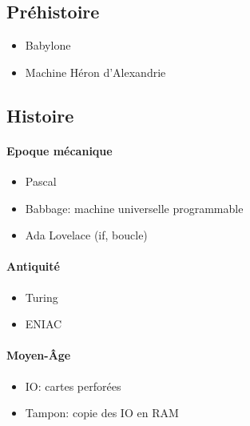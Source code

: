 \documentclass[11pt]{article}
\begin{document}
\subsection{Préhistoire}
\begin{itemize}
	\item Babylone
	\item Machine Héron d'Alexandrie
\end{itemize}

\subsection{Histoire}
\paragraph{Epoque mécanique}
\begin{itemize}
	\item Pascal
	\item Babbage: machine universelle programmable
	\item Ada Lovelace (if, boucle)
\end{itemize}

\paragraph{Antiquité}
\begin{itemize}
	\item Turing
	\item ENIAC
\end{itemize}

\paragraph{Moyen-Âge}
\begin{itemize}
	\item IO: cartes perforées
	\item Tampon: copie des IO en RAM
\end{itemize}
\end{document}
